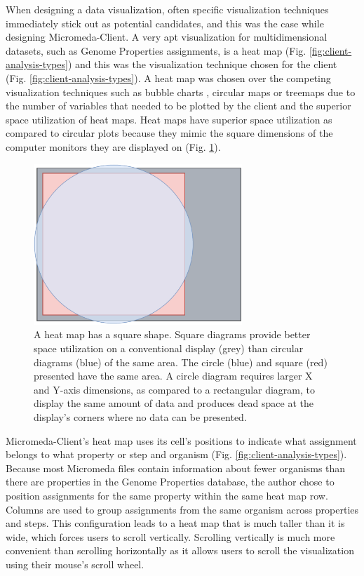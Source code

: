 When designing a data visualization, often specific visualization techniques immediately stick out as potential candidates, and this was the case while designing Micromeda-Client. A very apt visualization for multidimensional datasets, such as Genome Properties assignments, is a heat map \cite{wilkinson2009history,tufte2001visual}(Fig. \ref{fig:client-analysis-types}) and this was the visualization technique chosen for the client (Fig. \ref{fig:client-analysis-types}). A heat map was chosen over the competing visualization techniques such as bubble charts \cite{tufte2001visual}, circular maps \cite{ward2002taxonomy,stothard2004circular} or treemaps \cite{shneiderman1998tree} due to the number of variables that needed to be plotted by the client and the superior space utilization of heat maps. Heat maps have superior space utilization as compared to circular plots because they mimic the square dimensions of the computer monitors they are displayed on (Fig. \ref{fig:circle-square}).

\begin{figure}[!ht]
  \centering
	\includegraphics[width=0.7\textwidth]{media/square_vs_circle.pdf}
	 \caption{A heat map has a square shape. Square diagrams provide better space utilization on a conventional display (grey) than circular diagrams (blue) of the same area. The circle (blue) and square (red) presented have the same area. A circle diagram requires larger X and Y-axis dimensions, as compared to a rectangular diagram, to display the same amount of data and produces dead space at the display's corners where no data can be presented.}
	 \label{fig:circle-square}
\end{figure}

Micromeda-Client's heat map uses its cell's positions to indicate what assignment belongs to what property or step and organism (Fig. \ref{fig:client-analysis-types}). Because most Micromeda files contain information about fewer organisms than there are properties in the Genome Properties database, the author chose to position assignments for the same property within the same heat map row. Columns are used to group assignments from the same organism across properties and steps. This configuration leads to a heat map that is much taller than it is wide, which forces users to scroll vertically. Scrolling vertically is much more convenient than scrolling horizontally as it allows users to scroll the visualization using their mouse's scroll wheel.

